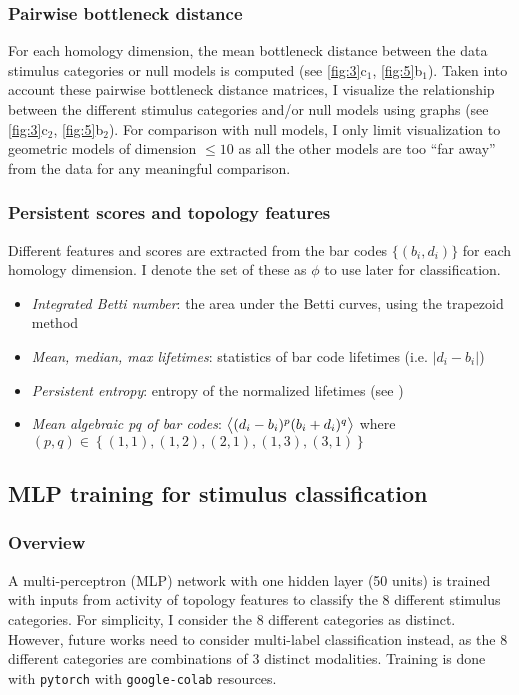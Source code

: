\subsubsection*{Pairwise bottleneck distance}

For each homology dimension, the mean bottleneck distance between the data stimulus categories or null models is computed (see \autoref{fig:3}c$_1$, \autoref{fig:5}b$_1$). Taken into account these pairwise bottleneck distance matrices, I visualize the relationship between the different stimulus categories and/or null models using graphs (see \autoref{fig:3}c$_2$, \autoref{fig:5}b$_2$). For comparison with null models, I only limit visualization to geometric models of dimension $\le 10$ as all the other models are too ``far away'' from the data for any meaningful comparison.

\subsubsection*{Persistent scores and topology features}

Different features and scores are extracted from the bar codes $\{(b_i,d_i)\}$ for each homology dimension. I denote the set of these as $\phi$ to use later for classification.

\begin{itemize}
    \item \textit{Integrated Betti number}: the area under the Betti curves, using the trapezoid method
    \item \textit{Mean, median, max lifetimes}: statistics of bar code lifetimes (i.e. $|d_i - b_i|$)
    \item \textit{Persistent entropy}: entropy of the normalized lifetimes (see \cite{Myers2019-ws})
    \item \textit{Mean algebraic pq of bar codes}: $\left\langle (d_i-b_i)^p (b_i+d_i)^q \right\rangle$ where $(p,q) \in \left \{(1,1),(1,2),(2,1),(1,3),(3,1) \right \}$
\end{itemize}

\subsection{MLP training for stimulus classification}

\subsubsection*{Overview}

A multi-perceptron (MLP) network with one hidden layer (50 units) is trained with inputs from activity of topology features to classify the 8 different stimulus categories. For simplicity, I consider the 8 different categories as distinct. However, future works need to consider multi-label classification instead, as the 8 different categories are combinations of 3 distinct modalities. Training is done with \texttt{pytorch} with \texttt{google-colab} resources.

